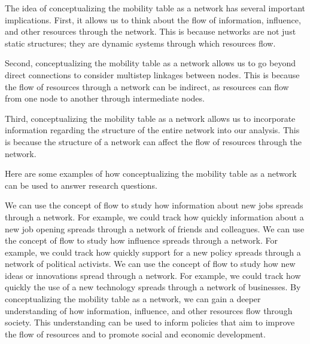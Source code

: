 \documentclass{article}
\begin{document}
The idea of conceptualizing the mobility table as a network has several important implications. First, it allows us to think about the flow of information, influence, and other resources through the network. This is because networks are not just static structures; they are dynamic systems through which resources flow.

Second, conceptualizing the mobility table as a network allows us to go beyond direct connections to consider multistep linkages between nodes. This is because the flow of resources through a network can be indirect, as resources can flow from one node to another through intermediate nodes.

Third, conceptualizing the mobility table as a network allows us to incorporate information regarding the structure of the entire network into our analysis. This is because the structure of a network can affect the flow of resources through the network.

Here are some examples of how conceptualizing the mobility table as a network can be used to answer research questions.

We can use the concept of flow to study how information about new jobs spreads through a network. For example, we could track how quickly information about a new job opening spreads through a network of friends and colleagues.
We can use the concept of flow to study how influence spreads through a network. For example, we could track how quickly support for a new policy spreads through a network of political activists.
We can use the concept of flow to study how new ideas or innovations spread through a network. For example, we could track how quickly the use of a new technology spreads through a network of businesses.
By conceptualizing the mobility table as a network, we can gain a deeper understanding of how information, influence, and other resources flow through society. This understanding can be used to inform policies that aim to improve the flow of resources and to promote social and economic development.
\end{document}
